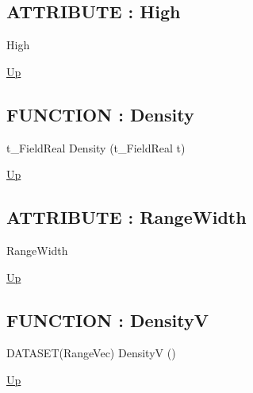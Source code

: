 \par
\par
\subsection*{ATTRIBUTE : High}
\hypertarget{ecldoc:linearregression.ols.distributionbase.high}{}
\begin{minipage}[t]{\textwidth}
\begin{flushleft}
 High 
\end{flushleft}
\end{minipage}
\hyperlink{ecldoc:linearregression.ols.distributionbase}{Up}

\par
\par
\subsection*{FUNCTION : Density}
\hypertarget{ecldoc:linearregression.ols.distributionbase.density}{}
\begin{minipage}[t]{\textwidth}
\begin{flushleft}
t\_FieldReal Density (t\_FieldReal t)
\end{flushleft}
\end{minipage}
\hyperlink{ecldoc:linearregression.ols.distributionbase}{Up}

\par
\par
\subsection*{ATTRIBUTE : RangeWidth}
\hypertarget{ecldoc:linearregression.ols.distributionbase.rangewidth}{}
\begin{minipage}[t]{\textwidth}
\begin{flushleft}
 RangeWidth 
\end{flushleft}
\end{minipage}
\hyperlink{ecldoc:linearregression.ols.distributionbase}{Up}

\par
\par
\subsection*{FUNCTION : DensityV}
\hypertarget{ecldoc:linearregression.ols.distributionbase.densityv}{}
\begin{minipage}[t]{\textwidth}
\begin{flushleft}
DATASET(RangeVec) DensityV ()
\end{flushleft}
\end{minipage}
\hyperlink{ecldoc:linearregression.ols.distributionbase}{Up}

